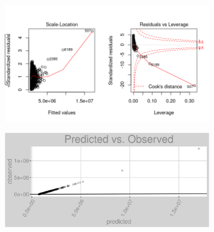 \begin{figure}[h]
\begin{subfigure}{1\textwidth}
\includegraphics[width=.99\textwidth, height=0.475\textheight]{Images/electricity_rf_res_2.png}
\centering
\end{subfigure}
\begin{subfigure}{1\textwidth}
\includegraphics[width=.99\textwidth, height=0.3\textheight]{Images/electricity_rf_pvo.png}
\centering
\end{subfigure}
\end{figure}
\newpage